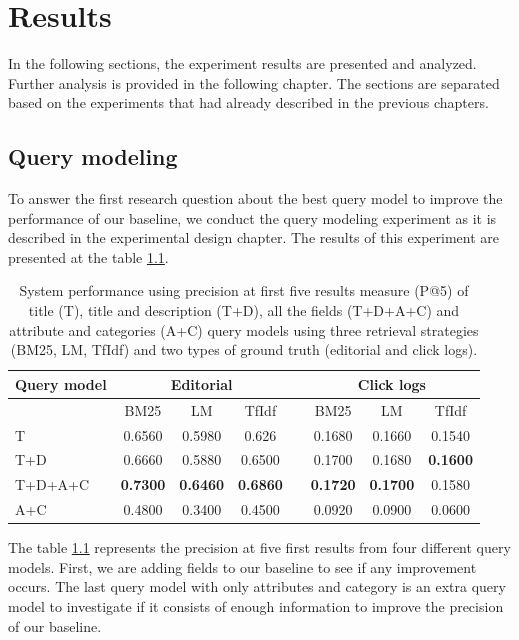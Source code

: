\chapter{Results}

In the following sections, the experiment results are presented and analyzed. Further analysis is provided in the following chapter. The sections are separated based on the experiments that had already described in the previous chapters.

\section{Query modeling}

To answer the first research question about the best query model to improve the performance of our baseline, we conduct the query modeling experiment as it is described in the experimental design chapter. The results of this experiment are presented at the table \ref{table:qmP5}.

\begin{table}[H]
\begin{center}
\caption{System performance using precision at first five results measure (P@5) of title (T), title and description (T+D), all the fields (T+D+A+C) and attribute and categories (A+C) query models using three retrieval strategies (BM25, LM, TfIdf) and two types of ground truth (editorial and click logs).}
\label{table:qmP5}

\begin{tabular}{lccccccc}
\toprule
Query model & \multicolumn{3}{c}{Editorial} & & \multicolumn{3}{c}{Click logs} \\
\midrule
& BM25 & LM & TfIdf &   & BM25 & LM & TfIdf \\
\midrule
T & 0.6560 &  0.5980 & 0.626 &   &         		0.1680 & 0.1660 & 0.1540 \\
T+D & 0.6660 & 0.5880 & 0.6500 &   &    			0.1700 & 0.1680 & \textbf{0.1600} \\
T+D+A+C & \textbf{0.7300} & \textbf{0.6460} & \textbf{0.6860} &   & \textbf{0.1720} & \textbf{0.1700} & 0.1580 \\
A+C & 0.4800 & 0.3400 & 0.4500 &   &     			0.0920 & 0.0900 & 0.0600 \\
\bottomrule
\end{tabular}
\end{center}
\end{table}

The table \ref{table:qmP5} represents the precision at five first results from four different query models. First, we are adding fields to our baseline to see if any improvement occurs. The last query model with only attributes and category is an extra query model to investigate if it consists of enough information to improve the precision of our baseline.

